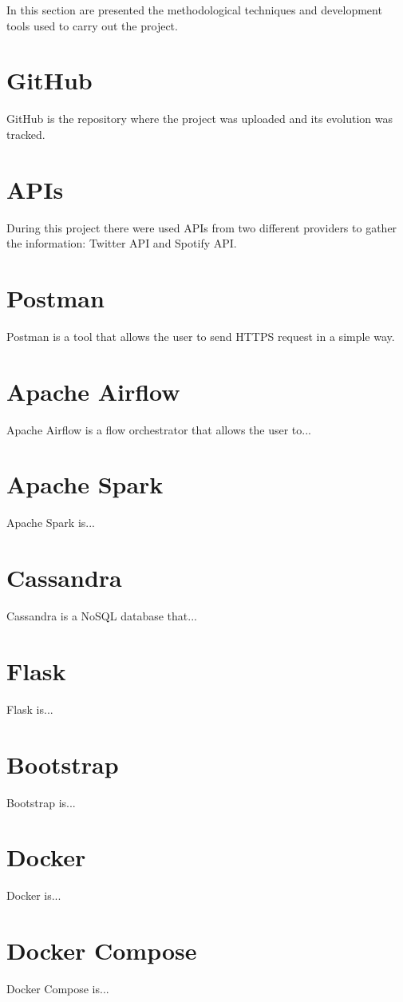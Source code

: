 
\nonzeroparskip In this section are presented the methodological techniques and development tools used to carry out the project.

\section{GitHub}

\nonzeroparskip GitHub is the repository where the project was uploaded and its evolution was tracked.

\section{APIs}

\nonzeroparskip During this project there were used APIs from two different providers to gather the information: Twitter API and Spotify API.

\section{Postman}

\nonzeroparskip Postman is a tool that allows the user to send HTTPS request in a simple way.

\section{Apache Airflow}

\nonzeroparskip Apache Airflow is a flow orchestrator that allows the user to...

\section{Apache Spark}

\nonzeroparskip Apache Spark is...

\section{Cassandra}

\nonzeroparskip Cassandra is a NoSQL database that...

\section{Flask}

\nonzeroparskip Flask is...

\section{Bootstrap}

\nonzeroparskip Bootstrap is...

\section{Docker}

\nonzeroparskip Docker is...

\section{Docker Compose}

\nonzeroparskip Docker Compose is...
